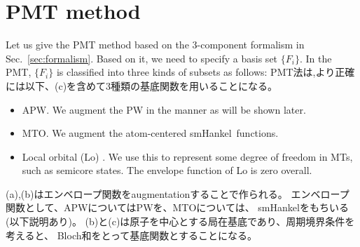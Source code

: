 \documentclass[twocolumn,showpacs,preprintnumbers,amsmath,amssymb,floatfix]{revtex4-1}
\newcommand{\bfR}{{\bf R}}
\newcommand{\refsec}[1]{\mbox{Sec.~\!\ref{#1}}}
\def\smh{smHankel}
\begin{document}
\section{PMT method}
\label{sec:pmtmethod} Let us give the PMT method based on the
3-component formalism in \refsec{sec:formalism}. Based on it, we need to
specify a basis set $\{F_i\}$.  In the PMT, $\{F_i\}$ is classified into
three kinds of subsets as follows:
PMT法は,より正確には以下、(c)を含めて3種類の基底関数を用いることになる。
\begin{itemize}
\item[(a)] APW. We augment the PW in the manner as will be shown later.

\item[(b)] MTO. We augment the atom-centered \smh\ functions. 

\item[(c)] Local orbital (Lo) \cite{lo}.
   We use this to represent some degree of freedom in MTs,
   such as semicore states. The envelope function of Lo is zero overall.

\end{itemize}
(a),(b)はエンベロープ関数をaugmentationすることで作られる。
エンベロープ関数として、APWについてはPWを、MTOについては、
\smh をもちいる(以下説明あり)。
(b)と(c)は原子を中心とする局在基底であり、周期境界条件を考えると、
Bloch和をとって基底関数とすることになる。
\end{document}
